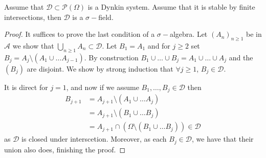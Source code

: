 \documentclass{scrartcl}
\begin{document}
  \begin{lemma}
    Assume that $\mathcal{D} \subset \mathcal{P}(\Omega)$ is a Dynkin system. Assume that it is
    stable by finite intersections, then $\mathcal{D}$ is a $\sigma-$field.
  \end{lemma}

  \begin{proof}
      It suffices to prove the last condition of a $\sigma-$algebra. Let $(A_n)_{n \geq 1}$ be
      in $\mathcal{A}$ we show that $\bigcup_{n \geq 1} A_n \subset \mathcal{D}$. Let $B_1 =
      A_1$ and for $j \geq 2$ set $B_j = A_j \setminus (A_1 \cup \ldots A_{j - 1})$. By
      construction $B_1 \cup \ldots \cup B_j = A_1 \cup \ldots \cup A_j$ and the $(B_j)$ are
      disjoint. We show by strong induction that $\forall j \geq 1$, $B_j \in \mathcal{D}$. 

      It is direct for $j = 1$, and now if we assume $B_1, \ldots, B_j \in \mathcal{D}$ then
      \begin{align*}
        B_{j+1} &= A_{j+1} \setminus (A_1 \cup \ldots A_j) \\
        &= A_{j+1} \setminus (B_1 \cup \ldots B_j) \\
        &= A_{j+1} \cap (\Omega \setminus (B_1 \cup \ldots B_j)) \in \mathcal{D}
      \end{align*}
      as $\mathcal{D}$ is closed under interscetion. Moreover, as each $B_j \in \mathcal{D}$,
      we have that their union also does, finishing the proof.
  \end{proof}
\end{document}
